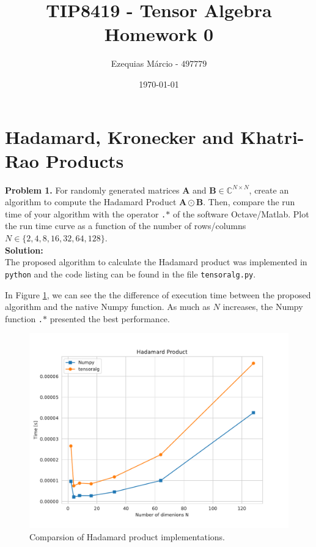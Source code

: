 \documentclass[12pt]{article}
\title{TIP8419 - Tensor Algebra\\ 
       Homework 0}
\author{Ezequias Márcio - $497779$}
\date{\today}
\begin{document}
\maketitle

\section*{Hadamard, Kronecker and Khatri-Rao Products}\vspace{.5cm}

\noindent
\textbf{Problem 1.} For randomly generated matrices $\bm{A}$ and $\bm{B}\in 
\mathbb{C}^{N\times N}$, create an algorithm to compute the Hadamard Product 
$\bm{A} \odot \bm{B}$. Then, compare the run time of your algorithm with
the operator \texttt{.$\ast$} of the software Octave/Matlab\textregistered. 
Plot the run time curve as a function of the number of rows/columns 
$N \in \{2,4,8,16,32,64,128\}$.\\

\noindent \textbf{Solution:}\\

The proposed algorithm to calculate the Hadamard product was implemented in 
\texttt{python} and the code listing can be found in the file 
\texttt{tensoralg.py}. 

In Figure \ref{hadm}, we can see the the difference of 
execution time between the proposed algorithm and the native Numpy function. 
As much as $N$ increases, the Numpy function \texttt{.$\ast$} 
presented the best performance.\\

\begin{figure}[!ht]
    \centering 
    \includegraphics[width=0.65\linewidth]{figs/hadm.pdf}
    \caption{Comparsion of Hadamard product implementations.}
    \label{hadm}
\end{figure}
\end{document}
